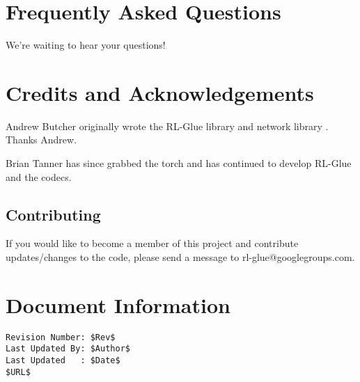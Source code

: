 \documentclass[11pt]{article}
\begin{document}
\section{Frequently Asked Questions}
We're waiting to hear your questions!

\section{Credits and Acknowledgements}
Andrew Butcher originally wrote the RL-Glue library and network library .  Thanks Andrew.

Brian Tanner has since grabbed the torch and has continued to develop RL-Glue and the codecs.

\subsection{Contributing}
If you would like to become a member of this project and contribute updates/changes to the code, please send a message to rl-glue@googlegroups.com.


\section*{Document Information}
\begin{verbatim}
Revision Number: $Rev$
Last Updated By: $Author$
Last Updated   : $Date$
$URL$
\end{verbatim}
\end{document}
